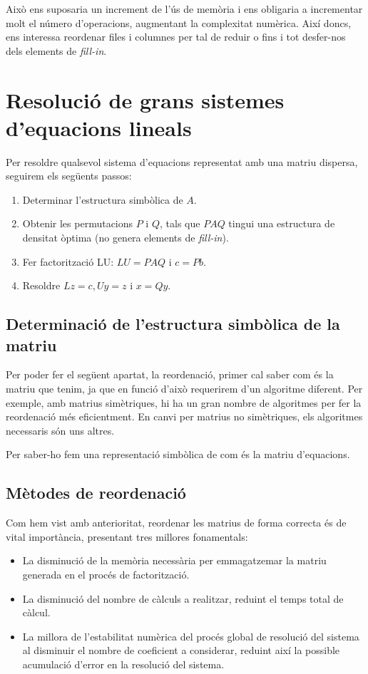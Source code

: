 \documentclass[11pt,a4paper,twoside]{report}
\begin{document}
Això ens suposaria un increment de l'ús de memòria i ens obligaria a incrementar molt el número d'operacions, augmentant la complexitat numèrica. Així doncs, ens interessa reordenar files i columnes per tal de reduir o fins i tot desfer-nos dels elements de \textit{fill-in}. 

\section{Resolució de grans sistemes d'equacions lineals}

Per resoldre qualsevol sistema d'equacions representat amb una matriu dispersa, seguirem els següents passos:

\begin{enumerate}
	\item Determinar l'estructura simbòlica de $A$.
	\item Obtenir les permutacions $P$ i $Q$, tals que $PAQ$ tingui una estructura de densitat òptima (no genera elements de \textit{fill-in}).
	\item Fer factorització LU: $LU = PAQ$ i $c = Pb$.
	\item Resoldre $Lz = c, Uy = z$ i $x=Qy$.
\end{enumerate}

\subsection{Determinació de l'estructura simbòlica de la matriu}

Per poder fer el següent apartat, la reordenació, primer cal saber com és la matriu que tenim, ja que en funció d'això requerirem d'un algoritme diferent. Per exemple, amb matrius simètriques, hi ha un gran nombre de algoritmes per fer la reordenació més eficientment. En canvi per matrius no simètriques, els algoritmes necessaris són uns altres.

Per saber-ho fem una representació simbòlica de com és la matriu d'equacions.

\subsection{Mètodes de reordenació}

Com hem vist amb anterioritat, reordenar les matrius de forma correcta és de vital importància, presentant tres millores fonamentals:

\begin{itemize}
	\item La disminució de la memòria necessària per emmagatzemar la matriu generada en el procés de factorització.
	\item La disminució del nombre de càlculs a realitzar, reduint el temps total de càlcul.
	\item La millora de l'estabilitat numèrica del procés global de resolució del sistema al disminuir el nombre de coeficient a considerar, reduint així la possible acumulació d'error en la resolució del sistema.
\end{itemize}
\end{document}
